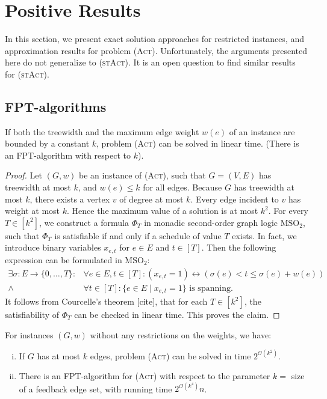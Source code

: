 \documentclass[runningheads]{llncs}
\numberwithin{equation}{section}
\newcommand{\set}[1]{\{ #1 \}}
\newcommand{\fromto}[2]{\set{#1, \ldots, #2}}
\newcommand{\bigO}{\mathcal{O}}
\newcommand{\act}{\textsc{(Act)}}
\newcommand{\stact}{\textsc{(stAct)}}
\begin{document}
\section{Positive Results}
\label{sec:positive_results}

In this section, we present exact solution approaches for restricted instances, and approximation results for problem {\act}. Unfortunately, the arguments presented here do not generalize to \stact. It is an open question to find similar results for \stact. 

\subsection{FPT-algorithms}

\begin{theorem}
If both the treewidth and the maximum edge weight $w(e)$ of an instance are bounded by  a constant $k$, problem {\act} can be solved in linear time. (There is an FPT-algorithm with respect to $k$). 
\end{theorem}
\begin{proof}
Let $(G, w)$ be an instance of {\act}, such that $G = (V, E)$ has treewidth at most $k$, and $w(e) \leq k$ for all edges. Because $G$ has treewidth at most $k$, there exists a vertex $v$ of degree at most $k$. Every edge incident to $v$ has weight at most $k$. Hence the maximum value of a solution is at most $k^2$. For every $T \in [k^2]$, we construct a formula $\Phi_T$ in monadic second-order graph logic $\text{MSO}_2$, such that $\Phi_T$ is satisfiable if and only if a schedule of value $T$ exists. In fact, we introduce binary variables $x_{e,t}$ for $e \in E$ and $t \in [T]$. Then the following expression can be formulated in $\text{MSO}_2$:
\begin{align*}
\exists \sigma :  E \rightarrow \fromto{0}{T} : &\forall e \in E, t \in [T]: (x_{e,t}=1) \leftrightarrow \left(\sigma(e) < t \leq \sigma(e) + w(e)\right)\\
\land &\forall t \in [T]: \set{e \in E \mid x_{e,t} = 1} \text{ is spanning.}
\end{align*}
It follows from Courcelle's theorem [cite], that for each $T \in [k^2]$, the satisfiability of $\Phi_T$ can be checked in linear time. This proves the claim.
\end{proof}

\begin{theorem}
For instances $(G, w)$ without any restrictions on the weights, we have: 
\begin{enumerate}[(i)]
\item If $G$ has at most $k$ edges, problem {\act} can be solved in time $2^{\bigO(k^2)}$.
\item There is an  FPT-algorithm for {\act} with respect to the parameter $k =$ size of a feedback edge set, with running time $2^{\bigO(k^4)}n$. 

\end{enumerate}
\end{theorem}
\end{document}
